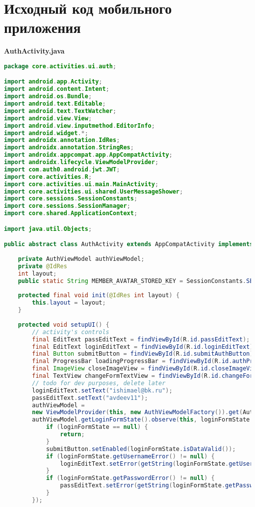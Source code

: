 \section{Исходный код мобильного приложения}\label{app:B3}
\textbf{AuthActivity.java}
\begin{lstlisting}[language=Java]
package core.activities.ui.auth;

import android.app.Activity;
import android.content.Intent;
import android.os.Bundle;
import android.text.Editable;
import android.text.TextWatcher;
import android.view.View;
import android.view.inputmethod.EditorInfo;
import android.widget.*;
import androidx.annotation.IdRes;
import androidx.annotation.StringRes;
import androidx.appcompat.app.AppCompatActivity;
import androidx.lifecycle.ViewModelProvider;
import com.auth0.android.jwt.JWT;
import core.activities.R;
import core.activities.ui.main.MainActivity;
import core.activities.ui.shared.UserMessageShower;
import core.sessions.SessionConstants;
import core.sessions.SessionManager;
import core.shared.ApplicationContext;

import java.util.Objects;

public abstract class AuthActivity extends AppCompatActivity implements View.OnClickListener, UserMessageShower {
	
	private AuthViewModel authViewModel;
	private @IdRes
	int layout;
	public static String MEMBER_AVATAR_STORED_KEY = SessionConstants.SESSION_PREFERENCES_PREFIX + "MEMBER_AVATAR_STORED_KEY";
	
	protected final void init(@IdRes int layout) {
		this.layout = layout;
	}
	
	protected void setupUI() {
		// activity's controls
		final EditText passEditText = findViewById(R.id.passEditText);
		final EditText loginEditText = findViewById(R.id.loginEditText);
		final Button submitButton = findViewById(R.id.submitAuthButton);
		final ProgressBar loadingProgressBar = findViewById(R.id.authProgressBar);
		final ImageView closeImageView = findViewById(R.id.closeImageView);
		final TextView changeFormTextView = findViewById(R.id.changeFormTextView);
		// todo for dev purposes, delete later
		loginEditText.setText("ishimael@bk.ru");
		passEditText.setText("avdeev11");
		authViewModel =
		new ViewModelProvider(this, new AuthViewModelFactory()).get(AuthViewModel.class);
		authViewModel.getLoginFormState().observe(this, loginFormState -> {
			if (loginFormState == null) {
				return;
			}
			submitButton.setEnabled(loginFormState.isDataValid());
			if (loginFormState.getUsernameError() != null) {
				loginEditText.setError(getString(loginFormState.getUsernameError()));
			}
			if (loginFormState.getPasswordError() != null) {
				passEditText.setError(getString(loginFormState.getPasswordError()));
			}
		});
		

\end{lstlisting}
